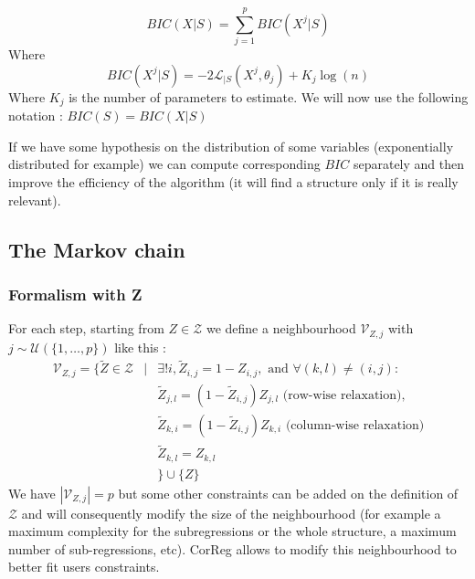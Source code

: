 \documentclass[11pt,a4paper]{article}
\begin{document}
	\begin{equation}
		BIC(X|S) = \sum_{j=1}^p BIC(X^j|S)
	\end{equation}		
    Where 
    \begin{equation}
    	BIC(X^j|S)=-2\mathcal{L}_{|S}(X^j,\theta_j)+K_j\operatorname{log}(n)
    \end{equation}
	Where $K_j$ is the number of parameters to estimate.
	We will now use the following notation : $BIC(S)=BIC(X|S)$	
	
	If we have some hypothesis on the distribution of some variables (exponentially distributed for example) we can compute corresponding $BIC$ separately and then improve the efficiency of the algorithm (it will find a structure only if it is really relevant).
	
	\subsection{The Markov chain}
		\subsubsection{Formalism with Z}
		For each step, starting from $Z \in \mathcal{Z}$ we define a neighbourhood $\mathcal{V}_{Z,j}$ with $j \sim \mathcal{U}(\{1,\dots,p\}) $ like this  :
		\begin{eqnarray*}
		\mathcal{V}_{Z,j}= \{ \tilde{Z} \in \mathcal{Z} &|&\exists ! i,  \tilde{Z}_{i,j}=1-Z_{i,j}, \textrm{ and } \forall (k,l) \neq (i,j) : \\
				&&  \tilde{Z}_{j,l}=(1-\tilde{Z}_{i,j})Z_{j,l} \textrm{ (row-wise relaxation)}, \\
				&& \tilde{Z}_{k,i}=(1-\tilde{Z}_{i,j}) Z_{k,i} \textrm{ (column-wise relaxation)} \\
				&&  \tilde{Z}_{k,l}=Z_{k,l} \\
				&& \} \cup\{Z \}
	\end{eqnarray*}	
	We have $|\mathcal{V}_{Z,j}|=p$ but some other constraints can be added on the definition of $\mathcal{Z}$ and will consequently modify the size of the neighbourhood (for example a maximum complexity for the subregressions or the whole structure, a maximum number of sub-regressions, etc). CorReg allows to modify this neighbourhood to better fit users constraints. 
\end{document}
